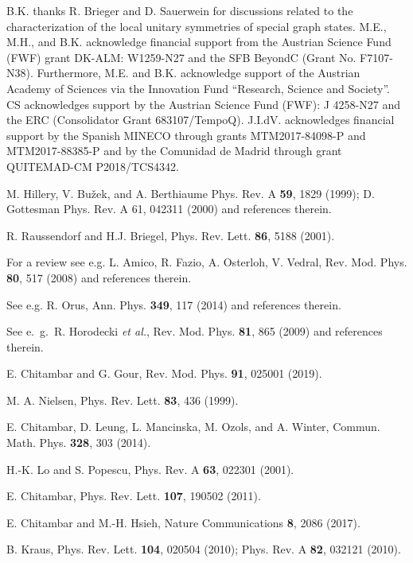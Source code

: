 \documentclass[superscriptaddress,twocolumn]{revtex4}\usepackage[utf8]{inputenc}
\begin{document}
B.K. thanks R. Brieger and D. Sauerwein for discussions related to the characterization of the local unitary symmetries of special graph states.  M.E., M.H., and B.K. acknowledge financial support from the Austrian Science Fund (FWF) grant DK-ALM: W1259-N27 and the SFB BeyondC (Grant No. F7107-N38). Furthermore, M.E. and B.K. acknowledge support of the Austrian Academy of Sciences via the Innovation Fund ``Research, Science and Society''. CS acknowledges support by the Austrian Science Fund (FWF): J 4258-N27 and the ERC (Consolidator Grant 683107/TempoQ). J.I.dV. acknowledges financial support by the Spanish MINECO through grants MTM2017-84098-P and MTM2017-88385-P and by the Comunidad de Madrid through grant QUITEMAD-CM P2018/TCS­4342.

\begin{thebibliography}{99}

 M. Hillery, V. Bu\v{z}ek, and A. Berthiaume Phys. Rev. A \textbf{59}, 1829 (1999); D. Gottesman Phys. Rev. A 61, 042311 (2000) and references therein.

 R. Raussendorf and H.J. Briegel, Phys. Rev. Lett. \textbf{86}, 5188 (2001).

 For a review see e.g. L. Amico, R. Fazio, A. Osterloh, V. Vedral, Rev. Mod. Phys. {\bf 80}, 517
(2008) and references therein.

 See e.g. R. Orus, Ann. Phys. \textbf{349}, 117 (2014) and references therein.

 See e.\ g.\ R. Horodecki \textit{et al.}, Rev. Mod. Phys. \textbf{81}, 865 (2009) and references therein.

 E. Chitambar and G. Gour, Rev. Mod. Phys. \textbf{91}, 025001 (2019).

 M. A. Nielsen, Phys. Rev. Lett. \textbf{83}, 436 (1999).

 E. Chitambar, D. Leung, L. Mancinska, M. Ozols, and A. Winter, Commun. Math. Phys. \textbf{328}, 303 (2014).

 H.-K. Lo and S. Popescu, Phys. Rev. A \textbf{63}, 022301 (2001).

 E. Chitambar, Phys. Rev. Lett. \textbf{107}, 190502 (2011).

 E. Chitambar and M.-H. Hsieh, Nature Communications \textbf{8}, 2086 (2017).

 B. Kraus, Phys. Rev. Lett. \textbf{104}, 020504 (2010); Phys. Rev. A \textbf{82}, 032121 (2010).


\end{thebibliography}
\end{document}

